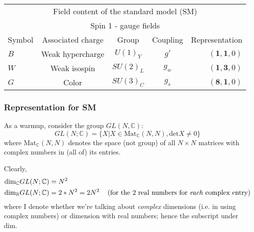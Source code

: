 \documentclass[10pt]{amsart}
\begin{document}
\begin{tabular}{l c c c r }
\multicolumn{5}{c}{Field content of the standard model (SM)} \\
\multicolumn{5}{c}{Spin 1 - gauge fields } \\
Symbol & Associated charge & Group & Coupling & Representation \\ 
$B$ & Weak hypercharge & $U(1)_Y$ & $g'$ & $( \mathbf{1}, \mathbf{1}, 0)$ \\
$W$ & Weak isospin & $SU(2)_L$ & $g_w$   & $(\mathbf{1}, \mathbf{3} , 0 )$ \\ 
$G$ & Color & $SU(3)_C$ & $g_s$ & $(\mathbf{8}, \mathbf{1}, 0)$  \\
\end{tabular}

\subsubsection{Representation for SM}

As a warmup, consider the group $GL(N,\mathbb{C})$:
\[
GL(N;\mathbb{C}) = \lbrace X | X \in \text{Mat}_{\mathbb{C}}(N,N), \text{det}X \neq 0 \rbrace
\]
where $\text{Mat}_{\mathbb{C}}(N,N)$ denotes the space (not group) of all $N\times N$ matrices with complex numbers in (all of) its entries.

Clearly, 
\[
\begin{aligned}
  & \text{dim}_{\mathbb{C}}GL(N;\mathbb{C}) = N^2 \\ 
  & \text{dim}_{\mathbb{R}}GL(N;\mathbb{C}) = 2*N^2 = 2N^2 \quad \, (\text{for the 2 real numbers for \emph{each} complex entry})
\end{aligned}
\]
where I denote whether we're talking about \emph{complex} dimensions (i.e. in using complex numbers) or dimension with real numbers; hence the subscript under $\text{dim}$.  
\end{document}
